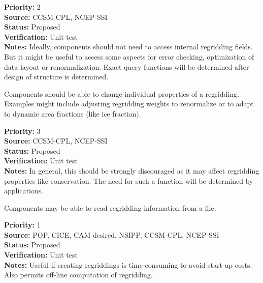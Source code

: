 \begin{reqlist}
{\bf Priority:} 2 \\
{\bf Source:} CCSM-CPL, NCEP-SSI \\
{\bf Status:} Proposed \\
{\bf Verification:} Unit test \\
{\bf Notes:} Ideally, components should not need to access internal
             regridding fields.  But it might be useful to access some
             aspects for error checking, optimization of data layout or
             renormalization.  Exact query functions will be determined
             after design of structure is determined.
\end{reqlist}


Components should be able to change individual properties of a
regridding.  Examples might include adjusting regridding weights to 
renormalize or to adapt to dynamic area fractions (like ice fraction).

\begin{reqlist}
{\bf Priority:} 3 \\
{\bf Source:} CCSM-CPL, NCEP-SSI \\
{\bf Status:} Proposed \\
{\bf Verification:} Unit test \\
{\bf Notes:} In general, this should be strongly discouraged as it may
             affect regridding properties like conservation.  The need
             for such a function will be determined by applications.
\end{reqlist}


Components may be able to read regridding information from a file.

\begin{reqlist}
{\bf Priority:} 1 \\
{\bf Source:} POP, CICE, CAM desired, NSIPP, CCSM-CPL, NCEP-SSI \\
{\bf Status:} Proposed \\
{\bf Verification:} Unit test \\
{\bf Notes:} Useful if creating regriddings is time-consuming to avoid
             start-up costs. Also permits off-line computation of regridding.
\end{reqlist}

